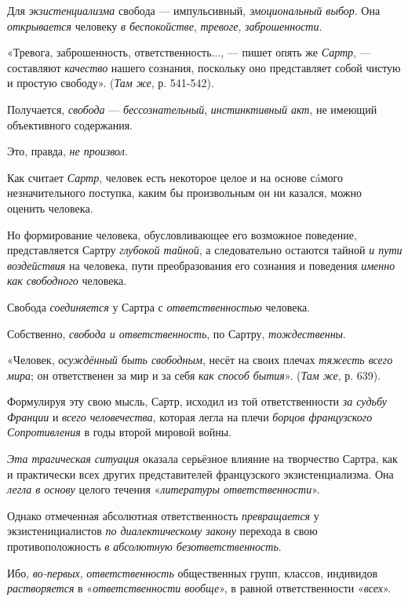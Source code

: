 \documentclass[a4paper,14pt,russian]{extreport}
\begin{document}
Для \emph{экзистенциализма} свобода --- импульсивный, \emph{эмоциональный выбор}. Она \emph{открывается} человеку \emph{в беспокойстве}, \emph{тревоге}, \emph{заброшенности}.

«Тревога, заброшенность, ответственность..., --- пишет опять же \emph{Сартр}, --- составляют \emph{качество} нашего сознания, поскольку оно представляет собой чистую и простую свободу». (\emph{Там же}, р. 541-542).

Получается, \emph{свобода} --- \emph{бессознательный}, \emph{инстинктивный акт}, не имеющий объективного содержания.

Это, правда, \emph{не произвол}.

Как считает \emph{Сартр}, человек есть некоторое целое и на основе сáмого незначительного поступка, каким бы произвольным он ни казался, можно оценить человека.

Но формирование человека, обусловливающее его возможное поведение, представляется Сартру \emph{глубокой тайной}, а следовательно остаются тайной \emph{и пути воздействия} на человека, пути преобразования его сознания и поведения \emph{именно как свободного} человека.

Свобода \emph{соединяется} у Сартра с \emph{ответственностью} человека.

Собственно, \emph{свобода и ответственность}, по Сартру, \emph{тождественны}.

«Человек, \emph{осуждённый быть свободным}, несёт на своих плечах \emph{тяжесть всего мира}; он ответственен за мир и за себя \emph{как способ бытия}». (\emph{Там же}, р. 639).

Формулируя эту свою мысль, Сартр, исходил из той ответственности \emph{за судьбу Франции} и \emph{всего человечества}, которая легла на плечи \emph{борцов французского Сопротивления} в годы второй мировой войны.

\emph{Эта трагическая ситуация} оказала серьёзное влияние на творчество Сартра, как и практически всех других представителей французского экзистенциализма. Она \emph{легла в основу} целого течения «\emph{литературы ответственности}».

Однако отмеченная абсолютная ответственность \emph{превращается} у экзистенициалистов \emph{по диалектическому закону} перехода в свою противоположность \emph{в абсолютную безответственность}.

Ибо, \emph{во-первых}, \emph{ответственность} общественных групп, классов, индивидов \emph{растворяется} в «\emph{ответственности вообще}», в равной ответственности «\emph{всех}».
\end{document}
